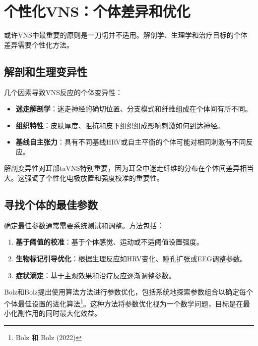 \documentclass[
  Letterpaper,
]{scrbook}
\providecommand{\tightlist}{%
  \setlength{\itemsep}{0pt}\setlength{\parskip}{0pt}}\usepackage{longtable,booktabs,array}
\begin{document}
\section{个性化VNS：个体差异和优化}\label{ux4e2aux6027ux5316vnsux4e2aux4f53ux5deeux5f02ux548cux4f18ux5316}

或许VNS中最重要的原则是一刀切并不适用。解剖学、生理学和治疗目标的个体差异需要个性化方法。

\subsection{解剖和生理变异性}\label{ux89e3ux5256ux548cux751fux7406ux53d8ux5f02ux6027}

几个因素导致VNS反应的个体变异性：

\begin{itemize}
\tightlist
\item
  \textbf{迷走解剖学}：迷走神经的确切位置、分支模式和纤维组成在个体间有所不同。
\item
  \textbf{组织特性}：皮肤厚度、阻抗和皮下组织组成影响刺激如何到达神经。
\item
  \textbf{基线自主张力}：具有不同基线HRV或自主平衡的个体可能对相同刺激有不同反应。
\end{itemize}

解剖变异性对耳部taVNS特别重要，因为耳朵中迷走纤维的分布在个体间差异相当大。这强调了个性化电极放置和强度校准的重要性。

\subsection{寻找个体的最佳参数}\label{ux5bfbux627eux4e2aux4f53ux7684ux6700ux4f73ux53c2ux6570}

确定最佳参数通常需要系统测试和调整。方法包括：

\begin{enumerate}
\def\labelenumi{\arabic{enumi}.}
\tightlist
\item
  \textbf{基于阈值的校准}：基于个体感觉、运动或不适阈值设置强度。
\item
  \textbf{生物标记引导优化}：根据生理反应如HRV变化、瞳孔扩张或EEG调整参数。
\item
  \textbf{症状滴定}：基于主观效果和治疗反应逐渐调整参数。
\end{enumerate}

Bolz和Bolz提出使用算法方法进行参数优化，包括系统地探索参数组合以确定每个个体最佳设置的进化算法\footnote{Bolz
  和 Bolz (2022)}。这种方法将参数优化视为一个数学问题，目标是在最小化副作用的同时最大化效益。
\end{document}

